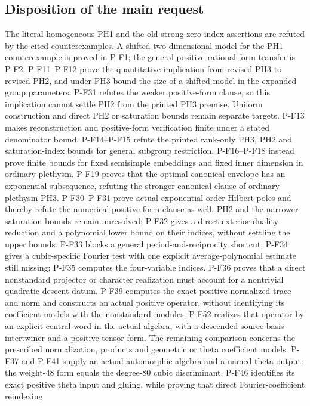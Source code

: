 \documentclass[11pt,a4paper]{article}
\begin{document}
\subsection{Disposition of the main request}
The literal homogeneous PH1 and the old strong zero-index assertions
are refuted by the cited counterexamples. A shifted two-dimensional
model for the PH1 counterexample is proved in P-F1; the general
positive-rational-form transfer is P-F2. P-F11--P-F12 prove the
quantitative implication from revised PH3 to revised PH2, and under
PH3 bound the size of a shifted model in the expanded group parameters.
P-F31 refutes the weaker positive-form clause, so this implication
cannot settle PH2 from the printed PH3 premise. Uniform construction
and direct PH2 or saturation bounds remain separate targets. P-F13 makes reconstruction and positive-form verification
finite under a stated denominator bound. P-F14--P-F15 refute the
printed rank-only PH3, PH2 and saturation-index bounds for general
subgroup restriction. P-F16--P-F18 instead prove finite bounds for
fixed semisimple embeddings and fixed inner dimension in ordinary
plethysm. P-F19 proves that the optimal canonical envelope has an
exponential subsequence, refuting the stronger canonical clause of
ordinary plethysm PH3. P-F30--P-F31 prove actual exponential-order
Hilbert poles and thereby refute the numerical positive-form clause
as well. PH2 and the narrower saturation bounds remain unresolved;
P-F32 gives a direct exterior-duality reduction and a polynomial
lower bound on their indices, without settling the upper bounds.
P-F33 blocks a general period-and-reciprocity shortcut; P-F34 gives
a cubic-specific Fourier test with one explicit average-polynomial
estimate still missing; P-F35 computes the four-variable indices.
P-F36 proves that a direct nonstandard projector or character
realization must account for a nontrivial quadratic descent datum.
P-F39 computes the exact positive normalized trace and norm and
constructs an actual positive operator, without identifying its
coefficient models with the nonstandard modules. P-F52 realizes
that operator by an explicit central word in the actual algebra,
with a descended source-basis intertwiner and a positive tensor
form. The remaining comparison concerns the prescribed
normalization, products and geometric or theta coefficient models.
P-F37 and P-F41
supply an actual automorphic algebra and a named theta output:
the weight-$48$ form equals the degree-$80$ cubic discriminant.
P-F46 identifies its exact positive theta input and gluing,
while proving that direct Fourier-coefficient reindexing
\end{document}
